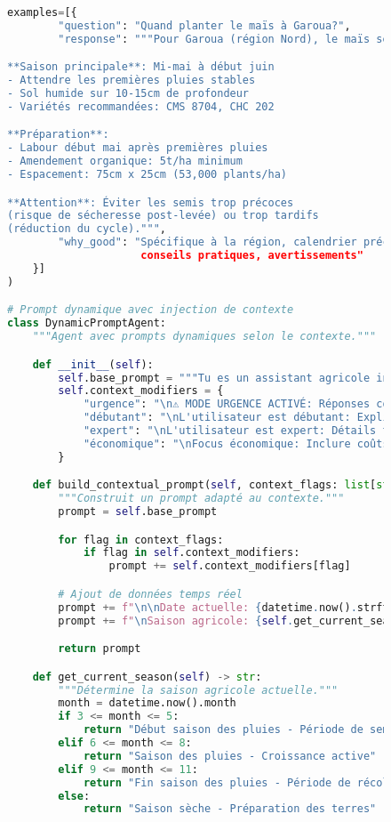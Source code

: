 \begin{figure}[h]
\begin{lstlisting}[language=Python, caption=Structure avancée des prompts]
    examples=[{
        "question": "Quand planter le maïs à Garoua?",
        "response": """Pour Garoua (région Nord), le maïs se plante:

**Saison principale**: Mi-mai à début juin
- Attendre les premières pluies stables
- Sol humide sur 10-15cm de profondeur
- Variétés recommandées: CMS 8704, CHC 202

**Préparation**:
- Labour début mai après premières pluies
- Amendement organique: 5t/ha minimum
- Espacement: 75cm x 25cm (53,000 plants/ha)

**Attention**: Éviter les semis trop précoces
(risque de sécheresse post-levée) ou trop tardifs
(réduction du cycle).""",
        "why_good": "Spécifique à la région, calendrier précis,
                     conseils pratiques, avertissements"
    }]
)

# Prompt dynamique avec injection de contexte
class DynamicPromptAgent:
    """Agent avec prompts dynamiques selon le contexte."""

    def __init__(self):
        self.base_prompt = """Tu es un assistant agricole intelligent."""
        self.context_modifiers = {
            "urgence": "\n⚠️ MODE URGENCE ACTIVÉ: Réponses courtes et actions immédiates.",
            "débutant": "\nL'utilisateur est débutant: Explications simples, éviter le jargon.",
            "expert": "\nL'utilisateur est expert: Détails techniques approfondis.",
            "économique": "\nFocus économique: Inclure coûts, ROI, analyses financières."
        }

    def build_contextual_prompt(self, context_flags: list[str]) -> str:
        """Construit un prompt adapté au contexte."""
        prompt = self.base_prompt

        for flag in context_flags:
            if flag in self.context_modifiers:
                prompt += self.context_modifiers[flag]

        # Ajout de données temps réel
        prompt += f"\n\nDate actuelle: {datetime.now().strftime('%d/%m/%Y')}"
        prompt += f"\nSaison agricole: {self.get_current_season()}"

        return prompt

    def get_current_season(self) -> str:
        """Détermine la saison agricole actuelle."""
        month = datetime.now().month
        if 3 <= month <= 5:
            return "Début saison des pluies - Période de semis principale"
        elif 6 <= month <= 8:
            return "Saison des pluies - Croissance active"
        elif 9 <= month <= 11:
            return "Fin saison des pluies - Période de récolte"
        else:
            return "Saison sèche - Préparation des terres"
\end{lstlisting}
\end{figure}


